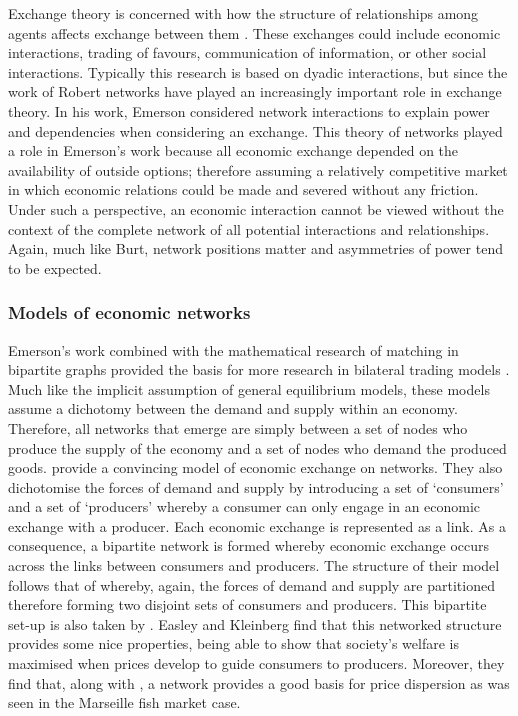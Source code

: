 Exchange theory is concerned with how the structure of relationships among agents affects exchange between them \citep{CookWhitmeyer1992}. These exchanges could include economic interactions, trading of favours, communication of information, or other social interactions. Typically this research is based on dyadic interactions, but since the work of Robert \citet{Emerson1962, Emerson1972a, Emerson1972b, Emerson1976} networks have played an increasingly important role in exchange theory. In his work, Emerson considered network interactions to explain power and dependencies when considering an exchange. This theory of networks played a role in Emerson's work because all economic exchange depended on the availability of outside options; therefore assuming a relatively competitive market in which economic relations could be made and severed without any friction. Under such a perspective, an economic interaction cannot be viewed without the context of the complete network of all potential interactions and relationships. Again, much like Burt, network positions matter and asymmetries of power tend to be expected.

\subsubsection{Models of economic networks}

Emerson's work combined with the mathematical research of matching in bipartite graphs \citep{Hall1935} provided the basis for more research in bilateral trading models \citep{Corominas-Bosch1999, Corominas-Bosch2004}. Much like the implicit assumption of general equilibrium models, these models assume a dichotomy between the demand and supply within an economy. Therefore, all networks that emerge are simply between a set of nodes who produce the supply of the economy and a set of nodes who demand the produced goods. \citet{Blume2009} provide a convincing model of economic exchange on networks. They also dichotomise the forces of demand and supply by introducing a set of `consumers' and a set of `producers' whereby a consumer can only engage in an economic exchange with a producer. Each economic exchange is represented as a link. As a consequence, a bipartite network is formed whereby economic exchange occurs across the links between consumers and producers. The structure of their model follows that of \citet{KrantonMinehart2001} whereby, again, the forces of demand and supply are partitioned therefore forming two disjoint sets of consumers and producers. This bipartite set-up is also taken by \citet[Chapter~10]{Jackson2008}. Easley and Kleinberg find that this networked structure provides some nice properties, being able to show that society's welfare is maximised when prices develop to guide consumers to producers. Moreover, they find that, along with \citet{Kakade2004a, Kakade2004b}, a network provides a good basis for price dispersion as was seen in the Marseille fish market case.

